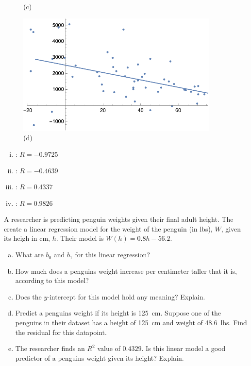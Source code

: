 \documentclass[11pt,letterpaper]{article}
\begin{document}
\begin{figure}[!ht]
\begin{minipage}{0.45\textwidth}
	   \caption*{(c)}
	\end{minipage}
	\begin{minipage}{0.45\textwidth}
	   \centering
	   \includegraphics[width=0.9\textwidth]{reg4.png}
	   \caption*{(d)}
	\end{minipage}
	\end{figure}

\begin{enumerate}[(i)]
\item \underline{\hspace{1.5cm}}: $R= -0.9725$
\item \underline{\hspace{1.5cm}}: $R= -0.4639$
\item \underline{\hspace{1.5cm}}: $R= 0.4337$
\item\underline{\hspace{1.5cm}}: $R= 0.9826$
\end{enumerate} 



\newpage



 A researcher is predicting penguin weights given their final adult height. The create a linear regression model for the weight of the penguin (in lbs), $W$, given its heigh in cm, $h$. Their model is $W(h)= 0.8h - 56.2$.
	\begin{enumerate}[(a)]
	\item What are $b_0$ and $b_1$ for this linear regression?
	\item How much does a penguins weight increase per centimeter taller that it is, according to this model?
	\item Does the $y$-intercept for this model hold any meaning? Explain. 
	\item Predict a penguins weight if its height is 125~cm. Suppose one of the penguins in their dataset has a height of 125~cm and weight of 48.6~lbs. Find the residual for this datapoint. 
	\item The researcher finds an $R^2$ value of $0.4329$. Is this linear model a good predictor of a penguins weight given its height? Explain. 
	\end{enumerate}
\end{document}
